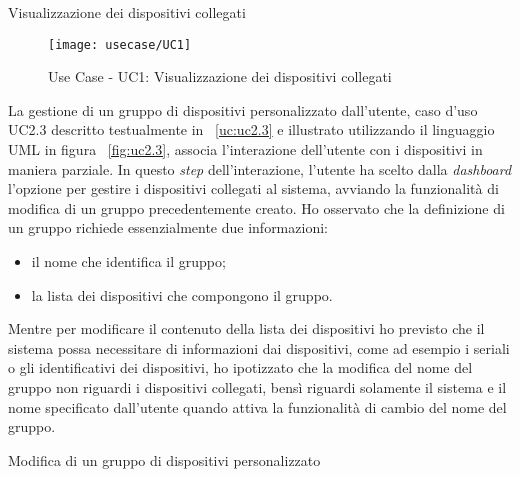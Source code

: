 \begin{usecase}{1}{Visualizzazione dei dispositivi collegati}
\label{uc:uc1}
\end{usecase}

\begin{figure}[!h]
    \centering
    \texttt{[image: usecase/UC1]}
    \caption{Use Case - UC1: Visualizzazione dei dispositivi collegati}
    \label{fig:uc1}
\end{figure}

La gestione di un gruppo di dispositivi personalizzato dall'utente, caso d'uso UC2.3 descritto testualmente in ~\ref{uc:uc2.3} e illustrato utilizzando il linguaggio UML in figura ~\ref{fig:uc2.3}, associa l'interazione dell'utente con i dispositivi in maniera parziale.
In questo \emph{step} dell'interazione, l'utente ha scelto dalla \emph{dashboard} l'opzione per gestire i dispositivi collegati al sistema, avviando la funzionalità di modifica di un gruppo precedentemente creato.
Ho osservato che la definizione di un gruppo richiede essenzialmente due informazioni:
\begin{itemize}
  \item il nome che identifica il gruppo;
  \item la lista dei dispositivi che compongono il gruppo.
\end{itemize}
Mentre per modificare il contenuto della lista dei dispositivi ho previsto che il sistema possa necessitare di informazioni dai dispositivi, come ad esempio i seriali o gli identificativi dei dispositivi, ho ipotizzato che la modifica del nome del gruppo non riguardi i dispositivi collegati, bensì riguardi solamente il sistema e il nome specificato dall'utente quando attiva la funzionalità di cambio del nome del gruppo.

\begin{usecase}{2.3}{Modifica di un gruppo di dispositivi personalizzato}
\label{uc:uc2.3}
\end{usecase}

